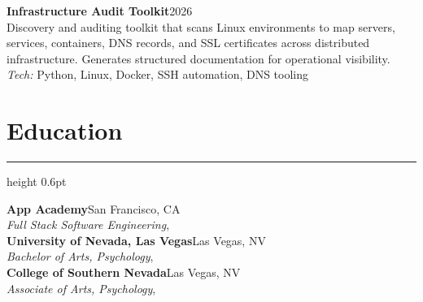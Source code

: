 \documentclass[10pt,letterpaper]{article}
\newcommand{\resheading}[1]{%
  \section*{#1}
  \vspace{-0.4em}\hrule height 0.6pt \vspace{0.45em}
}
\newcommand{\roleline}[4]{%
  {\bfseries #1}\hfill #2\\
  {\itshape #3}\if\relax\detokenize{#4}\relax\else, {\itshape #4}\fi\\
}
\begin{document}
\vspace{0.4em}

\textbf{Infrastructure Audit Toolkit}\hfill 2026\\
Discovery and auditing toolkit that scans Linux environments to map servers, services, containers, DNS records, and SSL certificates across distributed infrastructure. Generates structured documentation for operational visibility.\\
\textit{Tech:} Python, Linux, Docker, SSH automation, DNS tooling

\resheading{Education}

\roleline{App Academy}{San Francisco, CA}{Full Stack Software Engineering}{}

\vspace{0.2em}
\roleline{University of Nevada, Las Vegas}{Las Vegas, NV}{Bachelor of Arts, Psychology}{}

\vspace{0.2em}
\roleline{College of Southern Nevada}{Las Vegas, NV}{Associate of Arts, Psychology}{}
\end{document}
